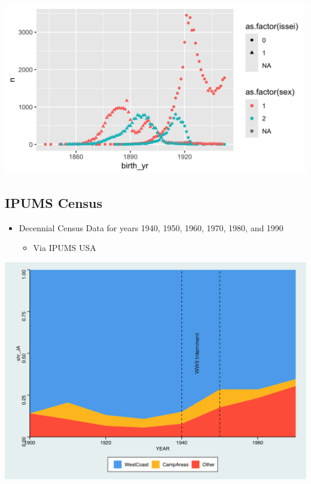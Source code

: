 \documentclass[12pt]{article}
\begin{document}
\includegraphics[width=1.0\textwidth]{figures/wra-internee-cohorts.png}

\subsection{IPUMS Census}\label{ipums-census}

\begin{itemize}

\item
  Decennial Census Data for years 1940, 1950, 1960, 1970, 1980, and 1990

  \begin{itemize}
  
  \item
    Via IPUMS USA \citep{ruggles_ipums_2024}
  \end{itemize}
\end{itemize}

\includegraphics[width=1.0\textwidth]{figures/shareareaplot.png}
\end{document}
